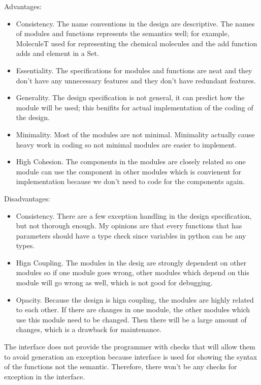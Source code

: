 \documentclass[12pt]{article}
\begin{document}
Advantages:
\begin{itemize}
\item Consistency. The name conventions in the design are descriptive. The names of modules and functions represents the semantics well; for example, MoleculeT used for representing the chemical molecules and the add function adds and element in a Set.
\item Essentiality. The specifications for modules and functions are neat and they don't have any unnecessary features and they don't have redundant features.
\item Generality. The design specification is not general, it can predict how the module will be used; this benifits for actual implementation of the coding of the design.
\item Minimality. Most of the modules are not minimal. Minimality actually cause heavy work in coding so not minimal modules are easier to implement.
\item High Cohesion. The components in the modules are closely related so one module can use the component in other modules which is convienent for implementation because we don't need to code for the components again.
\end{itemize}

\smallskip

Disadvantages:
\begin{itemize}
\item Consistency. There are a few exception handling in the design specification, but not thorough enough. My opinions are that every functions that has parameters should have a type check since variables in python can be any types.
\item Hign Coupling. The modules in the desig are strongly dependent on other modules so if one module goes wrong, other modules which depend on this module will go wrong as well, which is not good for debugging.
\item Opacity. Because the design is hign coupling, the modules are highly related to each other. If there are changes in one module, the other modules which use this module need to be changed. Then there will be a large amount of changes, which is a drawback for maintenance.
\end{itemize}

The interface does not provide the programmer with checks that will allow them to avoid generation an exception because interface is used for showing the syntax of the functions not the semantic. Therefore, there won't be any checks for exception in the interface.
\end{document}
